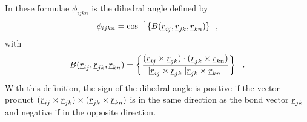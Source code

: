 In these formulae $\phi_{ijkn}$ is the dihedral angle defined by
\begin{equation}
\phi_{ijkn}=\cos^{-1}\{B(\mbox{$\underline{r}$}_{ij},\mbox{$\underline{r}$}_{jk},\mbox{$\underline{r}$}_{kn})\}~~,
\end{equation}
with
\begin{equation}
B(\mbox{$\underline{r}$}_{ij},\mbox{$\underline{r}$}_{jk},\mbox{$\underline{r}$}_{kn})= \left\{\frac{
(\mbox{$\underline{r}$}_{ij}\times\mbox{$\underline{r}$}_{jk})\cdot(\mbox{$\underline{r}$}_{jk}\times\mbox{$\underline{r}$}_{kn})}
{|\mbox{$\underline{r}$}_{ij}\times\mbox{$\underline{r}$}_{jk}||\mbox{$\underline{r}$}_{jk}\times\mbox{$\underline{r}$}_{kn}|}
\right\}~~.
\end{equation}
With this definition, the sign of the
dihedral angle is positive if the vector
product \linebreak[4] \mbox{$(\mbox{$\underline{r}$}_{ij} \times \mbox{$\underline{r}$}_{jk})
\times (\mbox{$\underline{r}$}_{jk} \times \mbox{$\underline{r}$}_{kn})$} is in the same
direction as the bond vector $\mbox{$\underline{r}$}_{jk}$
and negative if in the opposite direction.

